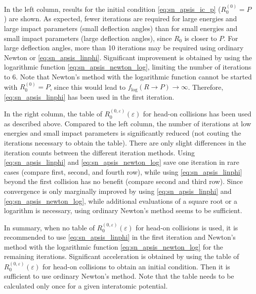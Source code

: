 In the left column, results for the initial condition \cref{eq:sn_apsis_ic_p} (\(R_0^{(0)} = P\)) are shown.
As expected, fewer iterations are required for large energies and large impact parameters (small deflection angles) than for small energies and small impact parameters (large deflection angles), since \(R_0\) is closer to \(P\).
For large deflection angles, more than 10 iterations may be required using ordinary Newton or \cref{eq:sn_apsis_linphi}.
Significant improvement is obtained by using the logarithmic function \cref{eq:sn_apsis_newton_log}, limiting the number of iterations to 6.
Note that Newton’s method with the logarithmic function cannot be started with \(R_0^{(0)} = P\), since this would lead to \(f_{\log}(R \rightarrow P) \rightarrow \infty\).
Therefore, \cref{eq:sn_apsis_linphi} has been used in the first iteration.

In the right column, the table of \(R_0^{(0,\varepsilon)}(\varepsilon)\) for head-on collisions has been used as described above.
Compared to the left column, the number of iterations at low energies and small impact parameters is significantly reduced (not couting the iterations necessary to obtain the table).
There are only slight differences in the iteration counts between the different iteration methods.
Using \cref{eq:sn_apsis_linphi} and \cref{eq:sn_apsis_newton_log} save one iteration in rare cases (compare first, second, and fourth row), while using \cref{eq:sn_apsis_linphi} beyond the first collision has no benefit (compare second and third row).
Since convergence is only marginally improved by using \cref{eq:sn_apsis_linphi} and \cref{eq:sn_apsis_newton_log}, while additional evaluations of a square root or a logarithm is necessary, using ordinary Newton’s method seems to be sufficient.

In summary, when no table of \(R_0^{(0,\varepsilon)}(\varepsilon)\) for head-on collisions is used, it is recommended to use \cref{eq:sn_apsis_linphi} in the first iteration and Newton’s method with the logarithmic function \cref{eq:sn_apsis_newton_log} for the remaining iterations. Significant acceleration is obtained by using the table of \(R_0^{(0,\varepsilon)}(\varepsilon)\) for head-on collisions to obtain an initial condition.
Then it is sufficient to use ordinary Newton’s method.
Note that the table needs to be calculated only once for a given interatomic potential.
